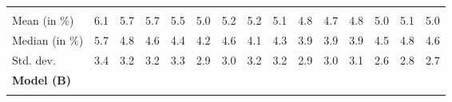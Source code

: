 \begin{tabular}{lllllllllllllll}
  \multicolumn{1}{|r}{} &
  \multicolumn{1}{r}{} &
  \multicolumn{1}{r}{} &
  \multicolumn{1}{r}{} &
  \multicolumn{1}{r}{} &
  \multicolumn{1}{r}{} &
  \multicolumn{1}{r}{} &
  \multicolumn{1}{r}{} &
  \multicolumn{1}{r}{} &
  \multicolumn{1}{r}{} &
  \multicolumn{1}{r}{} &
  \multicolumn{1}{r}{} &
  \multicolumn{1}{r}{} &
  \multicolumn{1}{r}{} \\
\multicolumn{1}{l}{\hspace{2em}Mean (in $\%$)} &
  \multicolumn{1}{|r}{6.1} &
  \multicolumn{1}{r}{5.7} &
  \multicolumn{1}{r}{5.7} &
  \multicolumn{1}{r}{5.5} &
  \multicolumn{1}{r}{5.0} &
  \multicolumn{1}{r}{5.2} &
  \multicolumn{1}{r}{5.2} &
  \multicolumn{1}{r}{5.1} &
  \multicolumn{1}{r}{4.8} &
  \multicolumn{1}{r}{4.7} &
  \multicolumn{1}{r}{4.8} &
  \multicolumn{1}{r}{5.0} &
  \multicolumn{1}{r}{5.1} &
  \multicolumn{1}{r}{5.0} \\
\multicolumn{1}{l}{\hspace{2em}Median (in $\%$)} &
  \multicolumn{1}{|r}{5.7} &
  \multicolumn{1}{r}{4.8} &
  \multicolumn{1}{r}{4.6} &
  \multicolumn{1}{r}{4.4} &
  \multicolumn{1}{r}{4.2} &
  \multicolumn{1}{r}{4.6} &
  \multicolumn{1}{r}{4.1} &
  \multicolumn{1}{r}{4.3} &
  \multicolumn{1}{r}{3.9} &
  \multicolumn{1}{r}{3.9} &
  \multicolumn{1}{r}{3.9} &
  \multicolumn{1}{r}{4.5} &
  \multicolumn{1}{r}{4.8} &
  \multicolumn{1}{r}{4.6} \\
\multicolumn{1}{l}{\hspace{2em}Std. dev.} &
  \multicolumn{1}{|r}{3.4} &
  \multicolumn{1}{r}{3.2} &
  \multicolumn{1}{r}{3.2} &
  \multicolumn{1}{r}{3.3} &
  \multicolumn{1}{r}{2.9} &
  \multicolumn{1}{r}{3.0} &
  \multicolumn{1}{r}{3.2} &
  \multicolumn{1}{r}{3.2} &
  \multicolumn{1}{r}{2.9} &
  \multicolumn{1}{r}{3.0} &
  \multicolumn{1}{r}{3.1} &
  \multicolumn{1}{r}{2.6} &
  \multicolumn{1}{r}{2.8} &
  \multicolumn{1}{r}{2.7} \\
\multicolumn{1}{l}{{\textbf{Model (B)}}} &
  \multicolumn{1}{|r}{} &
  \multicolumn{1}{r}{} &
  \multicolumn{1}{r}{} &
  \multicolumn{1}{r}{} &
  \multicolumn{1}{r}{} &
  \multicolumn{1}{r}{} &
  \multicolumn{1}{r}{} &
  \multicolumn{1}{r}{} &
  \multicolumn{1}{r}{} &
  \multicolumn{1}{r}{} &
  \multicolumn{1}{r}{} &
  \multicolumn{1}{r}{} &
  \multicolumn{1}{r}{} &
  \multicolumn{1}{r}{} \\
\multicolumn{1}{l}{\hspace{1em}{\textit{Mult. term} ($\widehat{\tau}^{adv}$)}} &
  \multicolumn{1}{|r}{} &
  \multicolumn{1}{r}{} &
  \multicolumn{1}{r}{} &
  \multicolumn{1}{r}{} &

\end{tabular}
